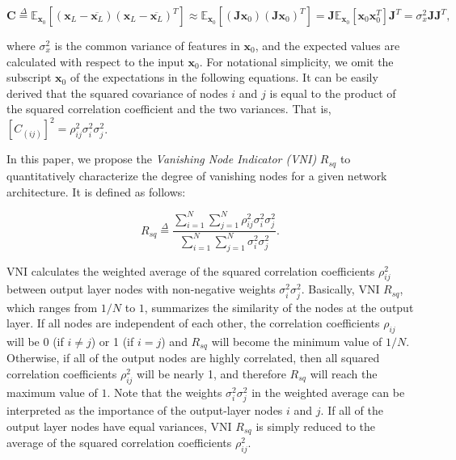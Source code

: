 \begin{equation}
    \mathbf{C} \overset{\Delta}{=}
    \mathbb{E}_{\mathbf{x}_0}[(\mathbf{x}_L-\overline{\mathbf{x}_L})(\mathbf{x}_L-\overline{\mathbf{x}_L})^T]
    \approx
    \mathbb{E}_{\mathbf{x}_0}[(\mathbf{Jx}_0)(\mathbf{Jx}_0)^T]
    =
    \mathbf{J}\mathbb{E}_{\mathbf{x}_0}[\mathbf{x}_0\mathbf{x}_0^T]\mathbf{J}^T
    =
    \sigma_x^2\mathbf{J}\mathbf{J}^T,
    \label{covariance_eqn}
\end{equation}

where $\sigma_x^2$ is the common variance of features in $\mathbf{x}_0$, and the expected values are calculated with respect to the input $\mathbf{x}_0$. For notational simplicity, we omit the subscript $\mathbf{x}_0$ of the expectations in the following equations. 
It can be easily derived that the squared covariance of nodes $i$ and $j$ is equal to the product of the squared correlation coefficient and the two variances. That is, $[C_{(ij)}]^2=\rho_{ij}^2\sigma_i^2\sigma_j^2$.

In this paper, we propose the \textit{Vanishing Node Indicator (VNI)} $R_{sq}$ to quantitatively characterize the degree of vanishing nodes for a given network architecture. It is defined as follows:

\begin{equation}
    R_{sq}\overset{\Delta}{=}
    \frac{\sum_{i=1}^N\sum_{j=1}^N\rho_{ij}^2\sigma_i^2\sigma_j^2}
{\sum_{i=1}^N\sum_{j=1}^N\sigma_i^2\sigma_j^2}.
\label{rsq_def}
\end{equation}

VNI calculates the weighted average of the squared correlation coefficients $\rho_{ij}^2$ between output layer nodes with non-negative weights $\sigma_i^2\sigma_j^2$. Basically, VNI $R_{sq}$, which ranges from $1/N$ to $1$, summarizes the similarity of the nodes at the output layer. If all nodes are independent of each other, the correlation coefficients $\rho_{ij}$ will be 0 (if $i\neq j$) or 1 (if $i=j$) and $R_{sq}$ will become the minimum value of $1/N$.
Otherwise, if all of the output nodes are highly correlated, then all squared correlation coefficients $\rho_{ij}^2$ will be nearly 1, and therefore $R_{sq}$ will reach the maximum value of $1$.
Note that the weights $\sigma_i^2\sigma_j^2$ in the weighted average can be interpreted as the importance of the output-layer nodes $i$ and $j$. If all of the output layer nodes have equal variances, VNI $R_{sq}$ is simply reduced to the average of the squared correlation coefficients $\rho_{ij}^2$.


